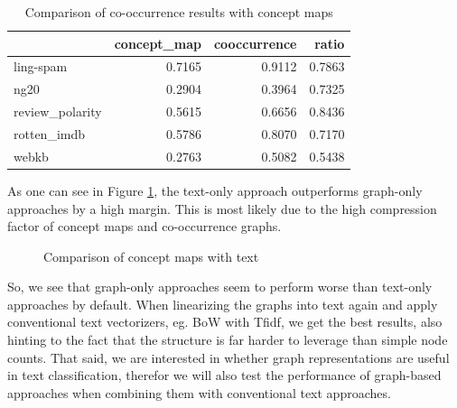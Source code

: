 \begin{table}[htb!]
\centering
\begin{tabular}{lrrr}
&  concept\_map &  cooccurrence &   ratio \\
\midrule
ling-spam       &  0.7165 &  0.9112 &  0.7863 \\
ng20            &  0.2904 &  0.3964 &  0.7325 \\
review\_polarity &  0.5615 &  0.6656 &  0.8436 \\
rotten\_imdb     &  0.5786 &  0.8070 &  0.7170 \\
webkb           &  0.2763 &  0.5082 &  0.5438 \\
\bottomrule
\end{tabular}
\caption[Results: Co-Occurrence vs. Concept Maps]{Comparison of co-occurrence results with concept maps}\label{table:comparison_results_cooccurrence}
\end{table}

As one can see in Figure \ref{fig:results_cmap_vs_text}, the text-only approach outperforms graph-only approaches by a high margin.
This is most likely due to the high compression factor of concept maps and co-occurrence graphs.

\begin{figure}[htb!]
\centering
\missingfigure[figcolor=white]{}
\caption[Results: Concept Maps vs. Text]{Comparison of concept maps with text}
\label{fig:results_cmap_vs_text}
\end{figure}

So, we see that graph-only approaches seem to perform worse than text-only approaches by default.
When linearizing the graphs into text again and apply conventional text vectorizers, eg. BoW with Tfidf, we get the best results, also hinting to the fact that the structure is far harder to leverage than simple node counts.
That said, we are interested in whether graph representations are useful in text classification, therefor we will also test the performance of graph-based approaches when combining them with conventional text approaches.


